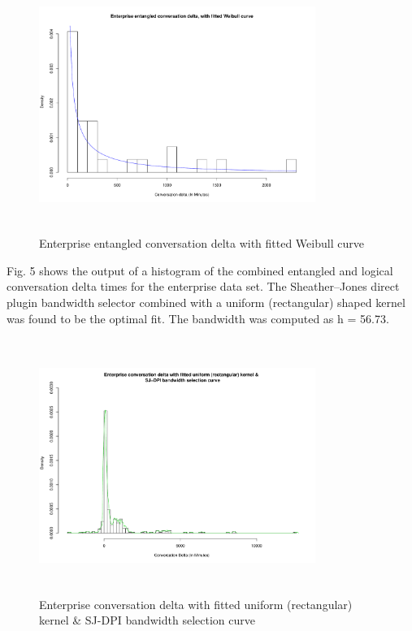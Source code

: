\documentclass[conference]{IEEEtran}
\begin{document}
\begin{figure}
\begin{center}
\includegraphics[height=8.3cm, width=9cm]{04_delta_entangled_enterprise.pdf} 
\caption{Enterprise entangled conversation delta with fitted Weibull curve}
\end{center}
\label{fig:delta_ent_ent}
\end{figure}

Fig. 5 shows the output of a histogram of the combined entangled and logical conversation delta times for the enterprise data set. The Sheather--Jones direct plugin bandwidth selector combined with a uniform (rectangular) shaped kernel was found to be the optimal fit.  The bandwidth was computed as h = 56.73.

\begin{figure}
\begin{center}
\includegraphics[height=8.3cm, width=9cm]{05_delta_kde_enterprise.pdf} 
\caption{Enterprise conversation delta with fitted uniform (rectangular) kernel & \n SJ-DPI bandwidth selection curve}
\end{center}
\label{fig:delta_kde_ent}
\end{figure}
\end{document}
